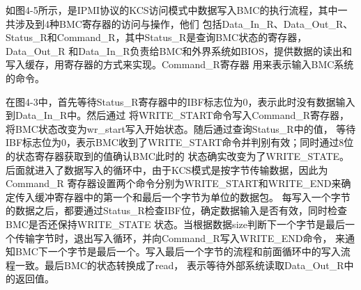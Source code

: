 如图4-5所示，是IPMI协议的KCS访问模式中数据写入BMC的执行流程，其中一共涉及到4种BMC寄存器的访问与操作，他们
包括Data\_In\_R、Data\_Out\_R、Status\_R和Command\_R，其中Status\_R是查询BMC状态的寄存器，Data\_Out\_R
和Data\_In\_R负责给BMC和外界系统如BIOS，提供数据的读出和写入缓存，用寄存器的方式来实现。Command\_R寄存器
用来表示输入BMC系统的命令。
\par 在图4-3中，首先等待Status\_R寄存器中的IBF标志位为0，表示此时没有数据输入到Data\_In\_R中。然后通过
将WRITE\_START命令写入Command\_R寄存器，将BMC状态改变为wr\_start写入开始状态。随后通过查询Status\_R中的值，
等待IBF标志位为0，表示BMC收到了WRITE\_START命令并判别有效；同时通过8位的状态寄存器获取到的值确认BMC此时的
状态确实改变为了WRITE\_STATE。后面就进入了数据写入的循环中，由于KCS模式是按字节传输数据，因此为Command\_R
寄存器设置两个命令分别为WRITE\_START和WRITE\_END来确定传入缓冲寄存器中的第一个和最后一个字节为单位的数据包。
每写入一个字节的数据之后，都要通过Status\_R检查IBF位，确定数据输入是否有效，同时检查BMC是否还保持WRITE\_STATE
状态。当根据数据size判断下一个字节是最后一个传输字节时，退出写入循环，并向Command\_R写入WRITE\_END命令，
来通知BMC下一个字节是最后一个。写入最后一个字节的流程和前面循环中的写入流程一致。最后BMC的状态转换成了read，
表示等待外部系统读取Data\_Out\_R中的返回值。

